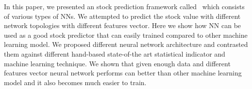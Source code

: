 
In this paper, we presented an stock prediction framework called \scheme\ which consists of various types of NNs. We attempted to predict the stock value with different network topologies with different features vector. Here we show how NN can be used as a good stock predictor that can easily trained compared to other machine learning model. We proposed different neural network architecture and
contrasted them against different hand-based state-of-the art statistical indicator and machine learning technique. We shown that given enough data and different features vector neural network performs can better than other machine learning model and it also becomes much easier to train.

